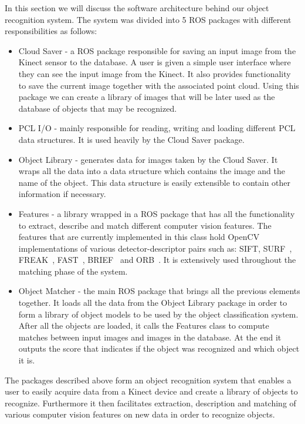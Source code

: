 In this section we will discuss the software architecture behind our object recognition system. The system was divided into 5 ROS packages with different responsibilities as follows:
\begin{itemize}
\item Cloud Saver - a ROS package responsible for saving an input image from the Kinect sensor to the database. A user is given a simple user interface where they can see the input image from the Kinect. It also provides functionality to save the current image together with the associated point cloud. Using this package we can create a library of images that will be later used as the database of objects that may be recognized.
\item PCL I/O - mainly responsible for reading, writing and loading different PCL data structures. It is used heavily by the Cloud Saver package.
\item Object Library - generates data for images taken by the Cloud Saver. It wraps all the data into a data structure which contains the image and the name of the object.  This data structure is easily extensible to contain other information if necessary.
\item Features - a library wrapped in a ROS package that has all the functionality to extract, describe and match different computer vision features. The features that are currently implemented in this class hold OpenCV implementations of various detector-descriptor pairs such as: SIFT, SURF~\cite{bay2006surf}, FREAK~\cite{alahi2012freak}, FAST~\cite{rosten2006machine}, BRIEF~\cite{calonder2010brief} and ORB~\cite{rublee2011orb}. It is extensively used throughout the matching phase of the system.
\item Object Matcher - the main ROS package that brings all the previous elements together. It loads all the data from the Object Library package in order to form a library of object models to be used by the object classification system. After all the objects are loaded, it calls the Features class to compute matches between input images and images in the database. At the end it outputs the score that indicates if the object was recognized and which object it is.
\end{itemize}


The packages described above form an object recognition system that enables a user to easily acquire data from a Kinect device and create a library of objects to recognize. Furthermore it then facilitates extraction, description and matching of various computer vision features on new data in order to recognize objects.




